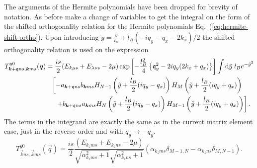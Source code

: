 The arguments of the Hermite polynomials have been dropped for brevity of notation.
As before make a change of variables to get the integral on the form of the shifted orthogonality relation for the Hermite polynomials Eq.~(\ref{eq:hermite-shift-ortho}).
Upon introducing $\tilde{y} = \frac{y}{l_{B}} + l_B( -iq_y - q_x - 2k_x) / 2$ the shifted orthogonality relation is used on the expression
\begin{equation}
  \label{eq:76}
  \begin{split}
    T^{y 0}_{\bm{k}+\mathfrak{q}ns, \bm{k}ms} (\bm{q})
    &= \frac{i s}{2}
    (E_{k \mu s} + E_{\lambda \nu s}- 2\mu )
    \exp \left[
      -\frac{l_B^2}{4} \left\{ \mathfrak{q}_y^2- 2 i q_y (2 k_x + q_x) \right\}
    \right]
    \int \mathrm{d}\tilde{y} \; l_B
    e^{-\tilde{y}^2}\\
    &\phantom{=} \left[
      - a_{\bm{k}+\mathfrak{q} ns} b_{\bm{k} ms}
      H_{N-1} \left( \tilde{y} + \frac{l_B}{2} ( iq_y - q_x) \right)
      H_M \left( \tilde{y} + \frac{l_B}{2} (iq_y + q_x) \right)\right.\\
      &\phantom{=\big[} \left.+ b_{\bm{k}+\mathfrak{q} ns} a_{\bm{k}ms}
      H_N \left( \tilde{y} + \frac{l_B}{2} ( iq_y - q_x) \right)
      H_{M-1} \left( \tilde{y} + \frac{l_B}{2} (iq_y + q_x) \right)
    \right].
  \end{split}
\end{equation}
The terms in the integrand are exactly the same as in the current matrix element case, just in the reverse order and with $q_y \to -q_y$.
\begin{equation}
  \label{eq:77}
  T^{y 0}_{\vec{k} ns, \vec{k}ms} (\vec{q})
  = \frac{i s}{2}
  \frac{
    (E_{k_z m s} + E_{k_z n s}- 2\mu )
  }{
    \sqrt{\alpha_{k_zms}^2 +1}
    \sqrt{\alpha_{k_zns}^2 + 1}
  }
  \left(
    \alpha_{k_z m s}
    \delta_{M-1, N}
    -
    \alpha_{k_z n s}
    \delta_{M, N-1}
  \right).
\end{equation}

